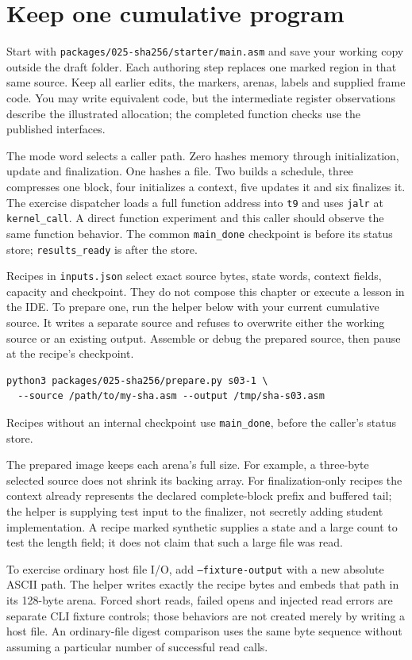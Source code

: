 \section{Keep one cumulative program}
Start with \texttt{packages/025-sha256/starter/main.asm} and save your working copy outside
the draft folder. Each authoring step replaces one marked region in that same source.
Keep all earlier edits, the markers, arenas, labels and supplied frame code. You may
write equivalent code, but the intermediate register observations describe the illustrated
allocation; the completed function checks use the published interfaces.

The mode word selects a caller path. Zero hashes memory through initialization, update
and finalization. One hashes a file. Two builds a schedule, three compresses one block,
four initializes a context, five updates it and six finalizes it. The exercise dispatcher
loads a full function address into \texttt{t9} and uses \texttt{jalr} at
\texttt{kernel\_call}. A direct function experiment and this caller should observe the
same function behavior. The common \texttt{main\_done} checkpoint is before its status
store; \texttt{results\_ready} is after the store.

Recipes in \texttt{inputs.json} select exact source bytes, state words, context fields,
capacity and checkpoint. They do not compose this chapter or execute a lesson in the
IDE. To prepare one, run the helper below with your current cumulative source. It writes
a separate source and refuses to overwrite either the working source or an existing
output. Assemble or debug the prepared source, then pause at the recipe's checkpoint.
\begin{verbatim}
python3 packages/025-sha256/prepare.py s03-1 \
  --source /path/to/my-sha.asm --output /tmp/sha-s03.asm
\end{verbatim}
Recipes without an internal checkpoint use \texttt{main\_done}, before the caller's status store.

The prepared image keeps each arena's full size. For example, a three-byte selected
source does not shrink its backing array. For finalization-only recipes the context
already represents the declared complete-block prefix and buffered tail; the helper
is supplying test input to the finalizer, not secretly adding student implementation.
A recipe marked synthetic supplies a state and a large count to test the length field;
it does not claim that such a large file was read.

To exercise ordinary host file I/O, add \texttt{--fixture-output} with a new absolute
ASCII path. The helper writes exactly the recipe bytes and embeds that path in its
128-byte arena. Forced short reads, failed opens and injected read errors are separate
CLI fixture controls; those behaviors are not created merely by writing a host file.
An ordinary-file digest comparison uses the same byte sequence without assuming a
particular number of successful read calls.

